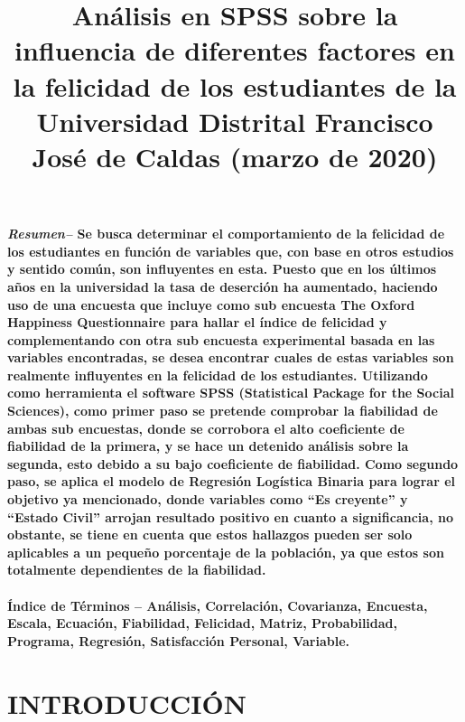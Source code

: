 \documentclass[conference]{IEEEtran}
\begin{document}
\title{Análisis en SPSS sobre la influencia de diferentes factores en la felicidad de los estudiantes de la Universidad Distrital Francisco José de Caldas
(marzo de 2020)
}

\author{
\and
{}
}

\maketitle
\textbf{\textit{Resumen--}
Se busca determinar el comportamiento de la felicidad de los estudiantes en función de variables que, con base en otros estudios y sentido común, son influyentes en esta. Puesto que en los últimos años en la universidad la tasa de deserción ha aumentado, haciendo uso de una encuesta que incluye como sub encuesta The Oxford Happiness Questionnaire para hallar el índice de felicidad y complementando con otra sub encuesta experimental basada en las variables encontradas, se desea encontrar cuales de estas variables son realmente influyentes en la felicidad de los estudiantes. Utilizando como herramienta el software SPSS (Statistical Package for the Social Sciences), como primer paso se pretende comprobar la fiabilidad de ambas sub encuestas, donde se corrobora el alto coeficiente de fiabilidad de la primera, y se hace un detenido análisis sobre la segunda, esto debido a su bajo coeficiente de fiabilidad. Como segundo paso, se aplica el modelo de Regresión Logística Binaria para lograr el objetivo ya mencionado, donde variables como “Es creyente” y “Estado Civil” arrojan resultado positivo en cuanto a significancia, no obstante, se tiene en cuenta que estos hallazgos pueden ser solo aplicables a un pequeño porcentaje de la población, ya que estos son totalmente dependientes de la fiabilidad.\\\\
Índice de Términos – Análisis, Correlación, Covarianza, Encuesta, Escala, Ecuación, Fiabilidad, Felicidad, Matriz, Probabilidad, Programa, Regresión, Satisfacción Personal, Variable.\\}

\section{INTRODUCCIÓN}\\
\end{document}

